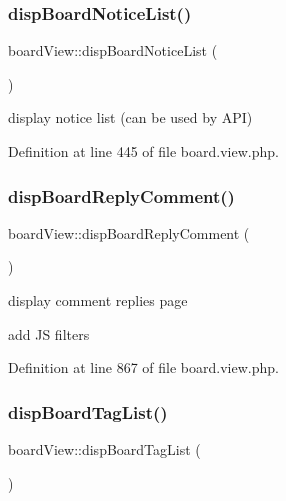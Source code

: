 \subsubsection{\texorpdfstring{disp\+Board\+Notice\+List()}{dispBoardNoticeList()}}
{\footnotesize\ttfamily board\+View\+::disp\+Board\+Notice\+List (\begin{DoxyParamCaption}{ }\end{DoxyParamCaption})}



display notice list (can be used by A\+PI) 



Definition at line 445 of file board.\+view.\+php.

\mbox{\label{classboardView_a3259609489d067b85899ba4c8581f25b}} 
\subsubsection{\texorpdfstring{disp\+Board\+Reply\+Comment()}{dispBoardReplyComment()}}
{\footnotesize\ttfamily board\+View\+::disp\+Board\+Reply\+Comment (\begin{DoxyParamCaption}{ }\end{DoxyParamCaption})}



display comment replies page 

add JS filters

Definition at line 867 of file board.\+view.\+php.

\mbox{\label{classboardView_a4619a8b099e5acb4c1c4e9022a445da4}} 
\subsubsection{\texorpdfstring{disp\+Board\+Tag\+List()}{dispBoardTagList()}}
{\footnotesize\ttfamily board\+View\+::disp\+Board\+Tag\+List (\begin{DoxyParamCaption}{ }\end{DoxyParamCaption})}



